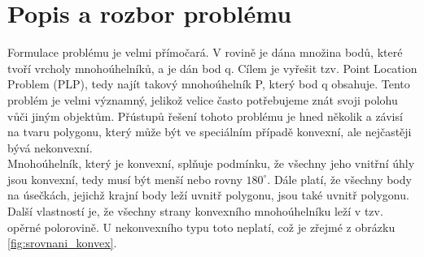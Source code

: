 \documentclass[a4paper,11pt,twoside]{article}
\begin{document}



\renewcommand{\baselinestretch}{1.35} %
\newpage
\tableofcontents %

\newpage
\listoffigures %

\thispagestyle{empty}
\newcommand{\obrazek}[1]{(viz obr. \ref{#1})} %

\newpage
\pagestyle{fancy}


\renewcommand{\sectionmark}[1]{\markright{\ #1}}

\fancyhf{} %
\renewcommand{\headrulewidth}{0.4pt} %
\renewcommand{\footrulewidth}{0.4pt}  %
\addtolength{\voffset}{-0.4cm}

\fancyhead[RE, RO]{\nouppercase{\rightmark}}
   
\fancyfoot[RO, LE]{{\textsc{\small \thepage}}}

\fancypagestyle{plain}{
  \fancyhead{} %
  \renewcommand{\headrulewidth}{0pt} %
}



\newpage
\pagestyle{fancy}

\vspace*{-1cm}
\section{Popis a rozbor problému}
\noindent
\large
Formulace problému je velmi přímočará. V rovině je dána množina bodů, které tvoří vrcholy mnohoúhelníků, a je dán bod q. Cílem je vyřešit tzv. Point Location Problem (PLP), tedy najít takový mnohoúhelník P, který bod q obsahuje. Tento problém je velmi významný, jelikož velice často potřebujeme znát svoji polohu vůči jiným objektům. Přústupů řešení tohoto problému je hned několik a závisí na tvaru polygonu, který může být ve speciálním případě konvexní, ale nejčastěji bývá nekonvexní. \\
\indent Mnohoúhelník, který je konvexní, splňuje podmínku, že všechny jeho vnitřní úhly jsou konvexní, tedy musí být menší nebo rovny $180^\circ$. Dále platí, že všechny body na úsečkách, jejichž krajní body leží uvnitř polygonu, jsou také uvnitř polygonu. Další vlastností je, že všechny strany konvexního mnohoúhelníku leží v tzv. opěrné polorovině. U nekonvexního typu toto neplatí, což je zřejmé z obrázku \ref{fig:srovnani_konvex}.
\end{document}
